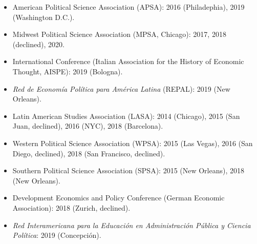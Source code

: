 \begin{itemize}
\item American Political Science Association (APSA): 2016 (Philadephia), 2019 (Washington D.C.).
\item Midwest Political Science Association (MPSA, Chicago): 2017, 2018 (declined), 2020.
\item International Conference (Italian Association for the History of Economic Thought, AISPE): 2019 (Bologna).
\item \emph{Red de Econom\'ia Pol\'itica para Am\'erica Latina} (REPAL): 2019 (New Orleans).
\item Latin American Studies Association (LASA): 2014 (Chicago), 2015 (San Juan, declined), 2016 (NYC), 2018 (Barcelona).
\item Western Political Science Association (WPSA): 2015 (Las Vegas), 2016 (San Diego, declined), 2018 (San Francisco, declined).
\item Southern Political Science Association (SPSA): 2015 (New Orleans), 2018 (New Orleans).
\item Development Economics and Policy Conference (German Economic Association): 2018 (Zurich, declined).
\item \emph{Red Interamericana para la Educaci\'on en Administraci\'on P\'ublica y Ciencia Pol\'itica}: 2019 (Concepci\'on).
\end{itemize}
